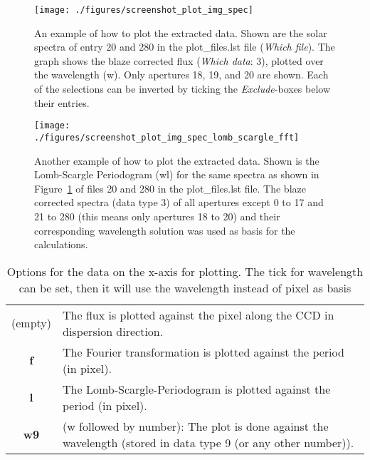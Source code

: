 \documentclass[10pt,a4paper]{article}
\begin{document}
\begin{figure} 
  \begin{center}
    \texttt{[image: ./figures/screenshot\_plot\_img\_spec]}
  \end{center} 
  \caption{An example of how to plot the extracted data. Shown are the solar spectra of entry 20 and 280 in the plot\_files.lst file (\textit{Which file}). The graph shows the blaze corrected flux (\textit{Which data}: 3), plotted over the wavelength (w). Only apertures 18, 19, and 20 are shown. Each of the selections can be inverted by ticking the \textit{Exclude}-boxes below their entries.
    \label{figure_plotting_results_example1}}
\end{figure}

\begin{figure} 
  \begin{center}
    \texttt{[image: ./figures/screenshot\_plot\_img\_spec\_lomb\_scargle\_fft]}
  \end{center} 
  \caption{Another example of how to plot the extracted data. Shown is the Lomb-Scargle Periodogram (wl) for the same spectra as shown in Figure~\ref{figure_plotting_results_example1} of files 20 and 280 in the plot\_files.lst file. The blaze corrected spectra (data type 3) of all apertures except 0 to 17 and 21 to 280 (this means only apertures 18 to 20) and their corresponding wavelength solution was used as basis for the calculations.
    \label{figure_plotting_results_example2}}
\end{figure}


\begin{table}[htb]
 \caption{Options for the data on the x-axis for plotting. The tick for wavelength can be set, then it will use the wavelength instead of pixel as basis\vspace{-0.9\baselineskip} }
 \label{Tab:plotting_options}
 \begin{tabularx}{\textwidth}{c X}
  (empty)    & The flux is plotted against the pixel along the CCD in dispersion direction.   \\
  \textbf{f} & The Fourier transformation is plotted against the period (in pixel).    \\
  \textbf{l} & The Lomb-Scargle-Periodogram is plotted against the period (in pixel).   \\
  \textbf{w9} & (w followed by number): The plot is done against the wavelength (stored in data type 9 (or any other number)).   \\
 \end{tabularx}
\end{table}
\end{document}
